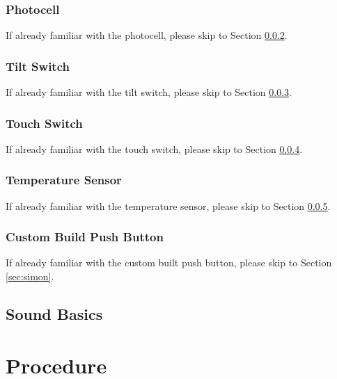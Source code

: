 \documentclass[12pt,letterpaper,oneside]{article}
\begin{document}
			\subsubsection{Photocell} \label{sec:photocell}
			If already familiar with the photocell, please skip to Section \ref{sec:tilt}. 
			
			\subsubsection{Tilt Switch} \label{sec:tilt}
			If already familiar with the tilt switch, please skip to Section \ref{sec:touch}. 

			\subsubsection{Touch Switch} \label{sec:touch}
			If already familiar with the touch switch, please skip to Section \ref{sec:temp}. 
				
			\subsubsection{Temperature Sensor} \label{sec:temp}
			If already familiar with the temperature sensor, please skip to Section \ref{sec:push}. 
			
			\subsubsection{Custom Build Push Button} \label{sec:push}
			If already familiar with the custom built push button, please skip to Section \ref{sec:simon}. 
						
			\subsection{Sound Basics} \label{sec:sound}

\section{Procedure}
		
\end{document}
